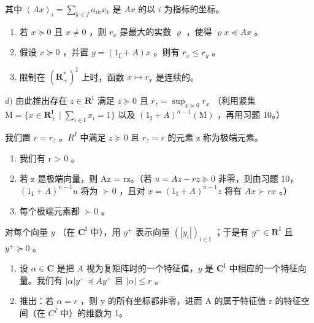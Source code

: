 其中 \((Ax)_i = \sum_{k\in I}a_{ik}x_k\) 是 \(Ax\) 的以 \(i\) 为指标的坐标。

\begin{enumerate}
\def\labelenumi{\alph{enumi})}
\item
  若 \(x \succcurlyeq 0\) 且 \(x \neq 0\) ，则 \(r_x\) 是最大的实数 \(\varrho\) ，使得 \(\varrho x \preccurlyeq Ax\) 。
\item
  假设 \(x \succcurlyeq 0\) ，并置 \(y = (1_{\mathrm{I}} + A)x\) 。则有 \(r_x \leqslant r_y\) 。
\item
  限制在 \((\mathbf{R}_{+}^{*})^{\mathrm{I}}\) 上时，函数 \(x \mapsto r_{x}\) 是连续的。
\end{enumerate}

\(d)\) 由此推出存在 \(z \in \mathbf{R}^{\mathrm{I}}\) 满足 \(z \succcurlyeq 0\) 且 \(r_z = \sup_{x \succcurlyeq 0} r_x\) （利用紧集 \(\mathrm{M} = \{x \in \mathbf{R}_{+}^{\mathrm{I}} \mid \sum_{i \in \mathrm{I}} x_i = 1\}\) 以及 \((1_{\mathrm{I}} + A)^{n-1}(\mathrm{M})\) ，再用习题 10。）

我们置 \(r = r_{z}\) 。\(R^{I}\) 中满足 \(z \succcurlyeq 0\) 且 \(r_{z} = r\) 的元素 z 称为极端元素。

\begin{enumerate}
\def\labelenumi{\alph{enumi})}
\setcounter{enumi}{4}
\item
  我们有 r \textgreater{} 0 。
\item
  若 z 是极端向量，则 Az = rz。（若 \(u = Az - rz \succcurlyeq 0\) 非零，则由习题 10，\((1_{\mathrm{I}} + A)^{n-1}u\) 将为 \(\succ 0\) ，且对 \(x = (1_{\mathrm{I}} + A)^{n-1}z\) 将有 \(Ax \succ rx\) 。）
\item
  每个极端元素都 \(\succ 0\) 。
\end{enumerate}

对每个向量 \(y\) （在 \(\mathbf{C}^{\mathrm{I}}\) 中），用 \(y^{+}\) 表示向量 \((|y_{i}|)_{i\in \mathrm{I}}\) ；于是有 \(y^{+}\in \mathbf{R}^{\mathrm{I}}\) 且 \(y^{+}\succcurlyeq 0\) 。

\begin{enumerate}
\def\labelenumi{\alph{enumi})}
\setcounter{enumi}{7}
\item
  设 \(\alpha \in \mathbf{C}\) 是把 \(A\) 视为复矩阵时的一个特征值，\(y\) 是 \(\mathbf{C}^{\mathrm{I}}\) 中相应的一个特征向量。我们有 \(|\alpha|y^{+} \preccurlyeq Ay^{+}\) 且 \(|\alpha| \leqslant r\) 。
\item
  推出：若 \(\alpha = r\) ，则 y 的所有坐标都非零，进而 A 的属于特征值 r 的特征空间（在 \(C^{I}\) 中）的维数为 1。
\end{enumerate}

